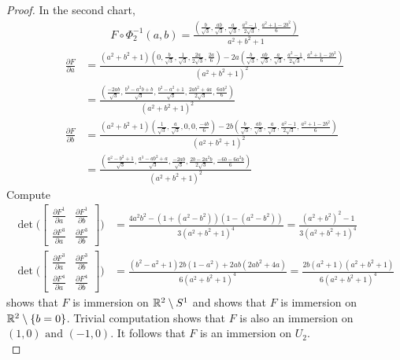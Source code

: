 \documentclass{report}
\begin{document}
\begin{proof}
In the second chart, 
\begin{align*}
F\circ \Phi_2^{-1}(a,b)= \frac{( \frac{b}{\sqrt{3} }, \frac{ab}{\sqrt{3} }, \frac{a}{\sqrt{3} }, \frac{a^2-1}{2\sqrt{3} }, \frac{a^2+1-2b^2}{6})}{a^2+b^2+1}
\end{align*}
\begin{align*}
\frac{\partial F}{\partial a}&= \frac{(a^2+b^2+1)(0, \frac{b}{\sqrt{3} }, \frac{1}{\sqrt{3} }, \frac{2a}{2\sqrt{3} }, \frac{2a}{6})-2a( \frac{b}{\sqrt{3} }, \frac{ab}{\sqrt{3} }, \frac{a}{\sqrt{3} }, \frac{a^2-1}{2\sqrt{3} }, \frac{a^2+1-2b^2}{6})}{(a^2+b^2+1)^2} \\
&=\frac{(\frac{-2ab}{\sqrt{3} }, \frac{b^3-a^2b+b}{\sqrt{3} }, \frac{b^2-a^2+1}{\sqrt{3} }, \frac{2ab^2+4a}{2\sqrt{3} }, \frac{6ab^2}{6})}{(a^2+b^2+1)^2} \\
 \frac{\partial F}{\partial b}&= \frac{(a^2+b^2+1)(\frac{1}{\sqrt{3} },\frac{a}{\sqrt{3} },0,0,\frac{-4b}{6})- 2b( \frac{b}{\sqrt{3} }, \frac{ab}{\sqrt{3} }, \frac{a}{\sqrt{3} }, \frac{a^2-1}{2\sqrt{3} }, \frac{a^2+1-2b^2}{6})}{(a^2+b^2+1)^2} \\
 &= \frac{(\frac{a^2-b^2+1}{\sqrt{3} }, \frac{a^3-ab^2+a}{\sqrt{3} }, \frac{-2ab}{\sqrt{3} }, \frac{2b-2a^2b}{2\sqrt{3} },\frac{-6b-6a^2b}{6})}{(a^2+b^2+1)^2}
\end{align*}
Compute 
\begin{align}
\label{mi6}
\operatorname{det}\Big( \begin{bmatrix}
    \frac{\partial F^1}{\partial a} & \frac{\partial F^1}{\partial b} \\
    \frac{\partial F^3}{\partial a} & \frac{\partial F^3}{\partial b}
\end{bmatrix}  \Big)&=  \frac{4a^2b^2-(1+(a^2-b^2))(1-(a^2-b^2))}{3(a^2+b^2+1)^4}= \frac{(a^2+b^2)^2-1}{3(a^2+b^2+1)^4} \\
\label{mi7} 
\operatorname{det}\Big(\begin{bmatrix}
    \frac{\partial F^3}{\partial a}& \frac{\partial F^3}{\partial b}\\
    \frac{\partial F^4}{\partial a}& \frac{\partial F^4}{\partial b}
\end{bmatrix} \Big)&= \frac{(b^2-a^2+1)2b(1-a^2)+2ab(2ab^2+4a)}{6(a^2+b^2+1)^4}= \frac{2b(a^2+1)(a^2+b^2+1)}{6(a^2+b^2+1)^4}
\end{align}
 shows that $F$ is immersion on  $\mathbb{R}^2 \setminus S^1$ and   shows that $F$ is immersion on $\mathbb{R}^2 \setminus \{ b=0 \}$. Trivial computation shows that $F$ is also an immersion on  $(1,0)\text{ and }(-1,0)$. It follows that $F$ is an immersion on  $U_2$.  \\ 


\end{proof}
\end{document}
